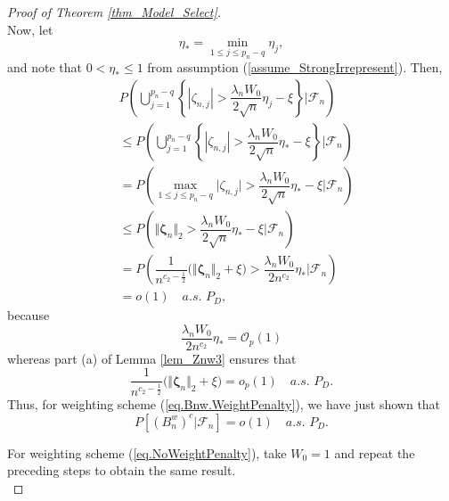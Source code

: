 \documentclass[ejs,authoryear,linksfromyear]{imsart}
\numberwithin{equation}{section}
\theoremstyle{plain}
\begin{document}
\begin{proof}[Proof of Theorem \ref{thm_Model_Select}]
$$	$$
	Now, let
	$$
	\eta_* = \min_{1 \leq j \leq p_n-q} \eta_j,
	$$
	and note that $0 < \eta_* \leq 1$ from assumption (\ref{assume_StrongIrrepresent}). Then, 
	\begin{align*}
	&P \left(
		\bigcup_{j=1}^{p_n - q}
		\left\{
			\left\vert \zeta_{n,j} \right\vert
			> \dfrac{\lambda_n W_0}{2 \sqrt{n}} \eta_j - \xi
		\right\}
		\Bigg| \mathcal{F}_n
	\right) \\
	&\leq P \left(
		\bigcup_{j=1}^{p_n - q}
		\left\{
			\left\vert \zeta_{n,j} \right\vert
			> \dfrac{\lambda_n W_0}{2 \sqrt{n}} \eta_* - \xi
		\right\}
		\Bigg| \mathcal{F}_n
	\right) \\
	&= P \left(
		\max_{1 \leq j \leq p_n-q}
		\big\vert \zeta_{n,j} \big\vert
		> \dfrac{\lambda_n W_0}{2 \sqrt{n}} \eta_* - \xi
		\Bigg| \mathcal{F}_n
	\right) \\
	&\leq P \left(
		\big\Vert \bm{\zeta}_n \big\Vert_2
		> \dfrac{\lambda_n W_0}{2 \sqrt{n}} \eta_* - \xi
		\Bigg| \mathcal{F}_n
	\right) \\
	&= P \left(
		\dfrac{1}{n^{c_2 - \frac{1}{2}}}
		\Big(
			\big\Vert \bm{\zeta}_n \big\Vert_2
			+ \xi
		\Big)
		> \dfrac{\lambda_n W_0}{2 n^{c_2}} \eta_* 
	\Bigg| \mathcal{F}_n
	\right) \\
	&= o(1) \quad a.s. \,\, P_D,
	\end{align*}
	because
	$$
	\dfrac{\lambda_n W_0}{2 n^{c_2}} \eta_*
	= \mathcal{O}_p(1)
	$$
	whereas part (a) of Lemma \ref{lem_Znw3} ensures that 
	$$
	\dfrac{1}{n^{c_2 - \frac{1}{2}}}
	\Big(
	\big\Vert \bm{\zeta}_n \big\Vert_2
	+ \xi
	\Big)
	= o_p(1) \quad a.s. \,\, P_D.
	$$
	Thus, for weighting scheme (\ref{eq.Bnw.WeightPenalty}), we have just shown that 
	$$
	P \left[ \left( B_n^w \right)^c \big\vert \mathcal{F}_n \right]
	= o(1) \quad a.s. \,\, P_D.
	$$
	
	For weighting scheme (\ref{eq.NoWeightPenalty}), take $W_0 = 1$ and repeat the preceding steps to obtain the same result. \\
	

\end{proof}
\end{document}
